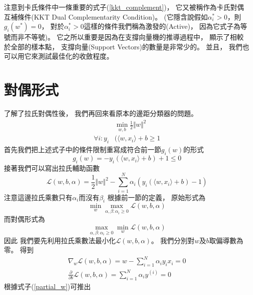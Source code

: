   注意到卡氏條件中一條重要的式子(\ref{kkt_complement})，
  它又被稱作為卡氏對偶互補條件(KKT Dual Complementarity Condition)。
  (它隱含說假如$\alpha_i^{*} > 0$，則$g_i(w^{*}) = 0$，
  對於$\alpha_i^{*} > 0$這樣的條件我們稱為激發的(Active)，
  因為它式子為等號而非不等號)。
  它之所以重要是因為在支撐向量機的推導過程中，
  顯示了相較於全部的樣本點，
  支撐向量(Support Vectors)的數量是非常少的。
  並且，
  我們也可以用它來測試最佳化的收斂程度。

\section{對偶形式}
  了解了拉氏對偶性後，
  我們再回來看原本的邊距分類器的問題。
  \begin{equation}
    \begin{split}
      &\min_{w, b} \frac{1}{2} \Vert w \Vert^2  \\
      \forall i: y_i &( \langle w, x_i \rangle + b \geq 1
    \end{split}
  \end{equation}
  首先我們把上述式子中的條件限制重寫成符合前一節$g_i(w)$的形式
  \begin{equation}
    g_i(w) = -y_i (\langle w, x_i \rangle + b) + 1 \leq 0
  \end{equation}
  接著我們可以寫出拉氏輔助函數
  \begin{equation}
    \mathcal{L}(w, b, \alpha) = \frac{1}{2} \Vert w \Vert^2 - \sum_{i=1}^N \alpha_i (y_i ( \langle w, x_i \rangle + b) - 1) \label{lagrangian} 
  \end{equation}
  注意這邊拉氏乘數只有$\alpha_i$而沒有$\beta_i$
  根據前一節的定義，
  原始形式為
  \begin{equation}
    \min_w \max_{\alpha, \beta: \alpha_i \geq 0} \mathcal{L}(w, b, \alpha)
  \end{equation}
  而對偶形式為
  \begin{equation}
    \max_{\alpha, \beta: \alpha_i \geq 0} \min_w \mathcal{L}(w, b, \alpha) 
  \end{equation}
  因此
  我們要先利用拉氏乘數法最小化$\mathcal{L}(w, b, \alpha)$。
  我們分別對$w$及$b$取偏導數為零。
  得到
  \begin{align}
    \nabla_w \mathcal{L}(w, b, \alpha) = w - \sum_{i=1}^N \alpha_i y_i x_i = 0 \label{partial_w}\\
    \frac{\partial}{\partial b} \mathcal{L}(w, b, \alpha) = \sum_{i=1}^N \alpha_i y^{(i)} = 0 \label{b_equal_0} 
  \end{align}
  根據式子(\ref{partial_w})可推出
